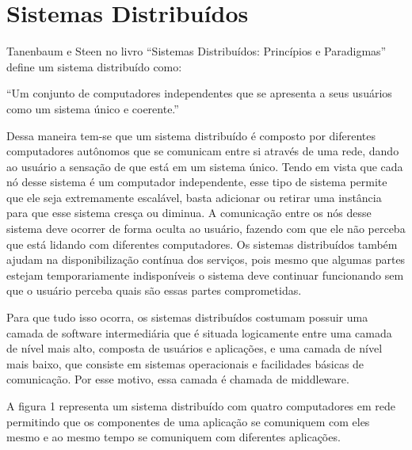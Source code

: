 \section{Sistemas Distribuídos}

    Tanenbaum e Steen no livro “Sistemas Distribuídos: Princípios e Paradigmas” define um sistema distribuído como: %

    “Um conjunto de computadores independentes que se apresenta a seus usuários como um sistema único e coerente.”

    Dessa maneira tem-se que um sistema distribuído é composto por diferentes computadores autônomos que se comunicam entre si através de uma rede, dando ao usuário a sensação de que está em um sistema único. Tendo em vista que cada nó desse sistema é um computador independente, esse tipo de sistema permite que ele seja extremamente escalável, basta adicionar ou retirar uma instância para que esse sistema cresça ou diminua. A comunicação entre os nós desse sistema deve ocorrer de forma oculta ao usuário, fazendo com que ele não perceba que está lidando com diferentes computadores. Os sistemas distribuídos também ajudam na disponibilização contínua dos serviços, pois mesmo que algumas partes estejam temporariamente indisponíveis o sistema deve continuar funcionando sem que o usuário perceba quais são essas partes comprometidas.

    Para que tudo isso ocorra, os sistemas distribuídos costumam possuir uma camada de software intermediária que é situada logicamente entre uma camada de nível mais alto, composta de usuários e aplicações, e uma camada de nível mais baixo, que consiste em sistemas operacionais e facilidades básicas de comunicação. Por esse motivo, essa camada é chamada de middleware.

    A figura 1 representa um sistema distribuído com quatro computadores em rede permitindo que os componentes de uma aplicação se comuniquem com eles mesmo e ao mesmo tempo se comuniquem com diferentes aplicações.



    